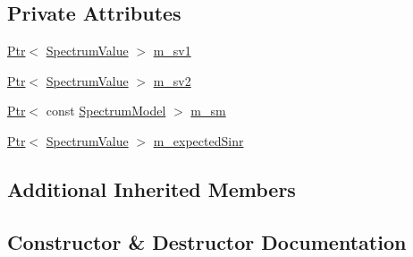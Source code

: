 \subsection*{Private Attributes}
\begin{DoxyCompactItemize}
\item 
\hyperlink{classns3_1_1Ptr}{Ptr}$<$ \hyperlink{classns3_1_1SpectrumValue}{Spectrum\+Value} $>$ \hyperlink{classLteUplinkDataSinrTestCase_a0b51a5eadfb0d59b4383934f650589f0}{m\+\_\+sv1}
\item 
\hyperlink{classns3_1_1Ptr}{Ptr}$<$ \hyperlink{classns3_1_1SpectrumValue}{Spectrum\+Value} $>$ \hyperlink{classLteUplinkDataSinrTestCase_a4978e3778e5c5a822c1c88575421e2a8}{m\+\_\+sv2}
\item 
\hyperlink{classns3_1_1Ptr}{Ptr}$<$ const \hyperlink{classns3_1_1SpectrumModel}{Spectrum\+Model} $>$ \hyperlink{classLteUplinkDataSinrTestCase_a7c731b1f130bbe8132c3e86692cff054}{m\+\_\+sm}
\item 
\hyperlink{classns3_1_1Ptr}{Ptr}$<$ \hyperlink{classns3_1_1SpectrumValue}{Spectrum\+Value} $>$ \hyperlink{classLteUplinkDataSinrTestCase_adca6c0366fbf143b1cfc0f92c591bc39}{m\+\_\+expected\+Sinr}
\end{DoxyCompactItemize}
\subsection*{Additional Inherited Members}


\subsection{Constructor \& Destructor Documentation}
